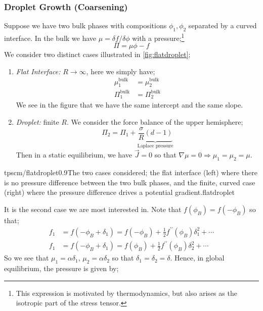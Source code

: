 \subsubsection{Droplet Growth (Coarsening)}
Suppose we have two bulk phases with compositions $\phi_1, \phi_2$ separated by a curved interface. In the bulk we have $\mu = \delta f/\delta \phi$ with a pressure;\footnote{This expression is motivated by thermodynamics, but also arises as the isotropic part of the stress tensor.}
\begin{equation*}
\Pi = \mu \phi - f
\end{equation*}
We consider two distinct cases illustrated in \autoref{fig:flatdroplet};
\begin{enumerate}
\item \emph{Flat Interface:} $R \rightarrow \infty$, here we simply have;
\begin{align*}
\mu_1^{\text{bulk}} &= \mu_2^{\text{bulk}} \\
\Pi_1^{\text{bulk}} &= \Pi_2^{\text{bulk}}
\end{align*}
We see in the figure that we have the same intercept and the same slope.
\item \emph{Droplet:} finite $R$. We consider the force balance of the upper hemisphere;
\begin{equation*}
\Pi_2 = \Pi_1 + \underbrace{\frac{\sigma}{R}(d - 1)}_{\text{Laplace pressure}}
\end{equation*}
Then in a static equilibrium, we have $\vec{J} = 0$ so that $\nabla \mu = 0 \Rightarrow \mu_1 = \mu_2 = \mu$.
\end{enumerate}
\begin{mygraphic}{tpscm/flatdroplet}{0.9}{The two cases considered; the flat interface (left) where there is no pressure difference between the two bulk phases, and the finite, curved case (right) where the pressure difference drives a potential gradient.}{flatdroplet}\end{mygraphic}
It is the second case we are most interested in. Note that $f(\phi_B) = f(-\phi_B)$ so that;
\begin{align*}
f_1 &= f(-\phi_B + \delta_1) = f(-\phi_B) + \frac{1}{2}f^{\prime\prime}(\phi_B)\delta_1^2 + \cdots \\
f_1 &= f(-\phi_B + \delta_1) = f(\phi_B) + \frac{1}{2}f^{\prime\prime}(\phi_B)\delta_2^2 + \cdots 
\end{align*}
So we see that $\mu_1 = \alpha \delta_1$, $\mu_2 = \alpha \delta_2$ so that $\delta_1 = \delta_2 = \delta$. Hence, in global equilibrium, the pressure is given by;
